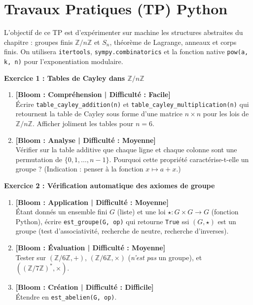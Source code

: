 \section*{Travaux Pratiques (TP) Python}

\vspace{0.3cm}
\noindent L'objectif de ce TP est d'expérimenter sur machine les structures abstraites du chapitre : groupes finis $\mathbb{Z}/n\mathbb{Z}$ et $S_n$, théorème de Lagrange, anneaux et corps finis. On utilisera \texttt{itertools}, \texttt{sympy.combinatorics} et la fonction native \texttt{pow(a, k, n)} pour l'exponentiation modulaire.

\vspace{0.3cm}

\noindent\textbf{Exercice 1 : Tables de Cayley dans $\mathbb{Z}/n\mathbb{Z}$}
\begin{enumerate}
    \item \textbf{[Bloom : Compréhension | Difficulté : Facile]} \\
    Écrire \texttt{table\_cayley\_addition(n)} et \texttt{table\_cayley\_multiplication(n)} qui retournent la table de Cayley sous forme d'une matrice $n \times n$ pour les lois de $\mathbb{Z}/n\mathbb{Z}$. Afficher joliment les tables pour $n = 6$.
    \item \textbf{[Bloom : Analyse | Difficulté : Moyenne]} \\
    Vérifier sur la table additive que chaque ligne et chaque colonne sont une permutation de $\{0, 1, \dots, n-1\}$. Pourquoi cette propriété caractérise-t-elle un groupe ? (Indication : penser à la fonction $x \mapsto a + x$.)
\end{enumerate}

\vspace{0.3cm}

\noindent\textbf{Exercice 2 : Vérification automatique des axiomes de groupe}
\begin{enumerate}
    \item \textbf{[Bloom : Application | Difficulté : Moyenne]} \\
    Étant donnés un ensemble fini $G$ (liste) et une loi $\star : G \times G \to G$ (fonction Python), écrire \texttt{est\_groupe(G, op)} qui retourne \texttt{True} ssi $(G, \star)$ est un groupe (test d'associativité, recherche de neutre, recherche d'inverses).
    \item \textbf{[Bloom : Évaluation | Difficulté : Moyenne]} \\
    Tester sur $(\mathbb{Z}/6\mathbb{Z}, +)$, $(\mathbb{Z}/6\mathbb{Z}, \times)$ (\emph{n'est pas} un groupe), et $((\mathbb{Z}/7\mathbb{Z})^*, \times)$.
    \item \textbf{[Bloom : Création | Difficulté : Difficile]} \\
    Étendre en \texttt{est\_abelien(G, op)}.
\end{enumerate}

